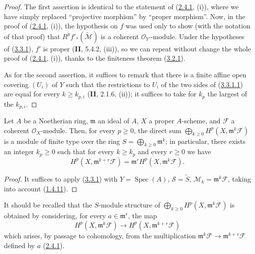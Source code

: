 \begin{proof}
The first assertion is identical to the statement of
(\hyperref[III.2.4.1]{2.4.1}, (i)), where we have simply replaced
``projective morphism'' by ``proper morphism''. Now, in the proof
of (\hyperref[III.2.4.1]{2.4.1}, (i)), the hypothesis on $f$ was used
only to show (with the notation of that proof) that
$R^pf'_*(\widetilde{\mathcal M})$ is a coherent $\mathcal O_{Y'}$-module.
Under the hypotheses of (\hyperref[III.3.3.1]{3.3.1}), $f'$ is proper
(\textbf{II}, 5.4.2, (iii)), so we can repeat without change the whole
proof of (\hyperref[III.2.4.1]{2.4.1}, (i)), thanks to the finiteness
theorem (\hyperref[III.3.2.1]{3.2.1}).

As for the second assertion, it suffices to remark that there is a
finite affine open covering $(U_i)$ of $Y$ such that the restrictions to
$U_i$ of the two sides of
(\hyperref[III.3.3.1.1]{3.3.1.1}) are equal for every
$k\geq k_{p,i}$ (\textbf{II}, 2.1.6, (ii)); it suffices to take for $k_p$ the
largest of the $k_{p,i}$.
\end{proof}

\begin{corollary}[3.3.2]
\label{III.3.3.2}
Let $A$ be a Noetherian ring, $\mathfrak m$ an ideal of $A$, $X$ a proper
$A$-scheme, and $\mathcal F$ a coherent $\mathcal O_X$-module. Then,
for every $p\geq0$, the direct sum
$\bigoplus_{k\geq0}H^p(X,\mathfrak m^k\mathcal F)$ is a module of finite type
over the ring $S=\bigoplus_{k\geq0}\mathfrak m^k$; in particular, there exists
an integer $k_p\geq0$ such that for every $k\geq k_p$ and every $r\geq0$ we have
\[
H^p(X,\mathfrak m^{k+r}\mathcal F)
=\mathfrak m^rH^p(X,\mathfrak m^k\mathcal F).
\tag{3.3.2.1}\label{III.3.3.2.1}
\]
\end{corollary}

\begin{proof}
It suffices to apply (\hyperref[III.3.3.1]{3.3.1}) with
$Y=\operatorname{Spec}(A)$, $\mathcal S=\widetilde S$,
$\mathcal M_k=\mathfrak m^k\mathcal F$, taking into account
(\hyperref[III.1.4.11]{1.4.11}).
\end{proof}

It should be recalled that the $S$-module structure of
$\bigoplus_{k\geq0}H^p(X,\mathfrak m^k\mathcal F)$ is obtained by considering,
for every $a\in\mathfrak m^r$, the map
\[
H^p(X,\mathfrak m^k\mathcal F)
\longrightarrow H^p(X,\mathfrak m^{k+r}\mathcal F)
\]
which arises, by passage to cohomology, from the multiplication
$\mathfrak m^k\mathcal F\to\mathfrak m^{k+r}\mathcal F$ defined by $a$
(\hyperref[III.2.4.1]{2.4.1}).

